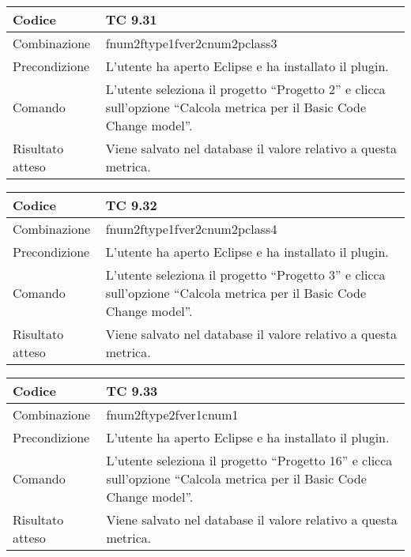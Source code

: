\begin{table}[ht]
\begin{tabular}{|p{3cm}|p{9cm}|}
\hline
\cellcolor{lightgray}Codice				& TC 9.31								\\
\hline
\cellcolor{lightgray}Combinazione		& fnum2ftype1fver2cnum2pclass3									\\
\hline
\cellcolor{lightgray}Precondizione		& L'utente ha aperto Eclipse e ha installato il plugin.		\\
\hline
\cellcolor{lightgray}Comando			& L'utente seleziona il progetto ``Progetto 2''  e clicca sull'opzione ``Calcola metrica per il Basic Code Change model''.	\\
\hline
\cellcolor{lightgray}Risultato atteso	& Viene salvato nel database il valore relativo a questa metrica.\\
\hline
\end{tabular}
\end{table}

\begin{table}[ht]
\begin{tabular}{|p{3cm}|p{9cm}|}
\hline
\cellcolor{lightgray}Codice				& TC 9.32								\\
\hline
\cellcolor{lightgray}Combinazione		& fnum2ftype1fver2cnum2pclass4									\\
\hline
\cellcolor{lightgray}Precondizione		& L'utente ha aperto Eclipse e ha installato il plugin.		\\
\hline
\cellcolor{lightgray}Comando			& L'utente seleziona il progetto ``Progetto 3''  e clicca sull'opzione ``Calcola metrica per il Basic Code Change model''.	\\
\hline
\cellcolor{lightgray}Risultato atteso	& Viene salvato nel database il valore relativo a questa metrica.\\
\hline
\end{tabular}
\end{table}

\begin{table}[ht]
\begin{tabular}{|p{3cm}|p{9cm}|}
\hline
\cellcolor{lightgray}Codice				& TC 9.33								\\
\hline
\cellcolor{lightgray}Combinazione		& fnum2ftype2fver1cnum1									\\
\hline
\cellcolor{lightgray}Precondizione		& L'utente ha aperto Eclipse e ha installato il plugin.		\\
\hline
\cellcolor{lightgray}Comando			& L'utente seleziona il progetto ``Progetto 16''  e clicca sull'opzione ``Calcola metrica per il Basic Code Change model''.	\\
\hline
\cellcolor{lightgray}Risultato atteso	& Viene salvato nel database il valore relativo a questa metrica.\\
\hline
\end{tabular}
\end{table}

